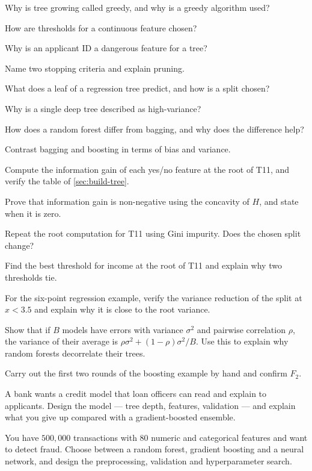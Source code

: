 \sq Why is tree growing called greedy, and why is a greedy algorithm used?

\sq How are thresholds for a continuous feature chosen?

\sq Why is an applicant ID a dangerous feature for a tree?

\sq Name two stopping criteria and explain pruning.

\sq What does a leaf of a regression tree predict, and how is a split chosen?

\sq Why is a single deep tree described as high-variance?

\sq How does a random forest differ from bagging, and why does the difference
help?

\sq Contrast bagging and boosting in terms of bias and variance.


\ap Compute the information gain of each yes/no feature at the root of T11, and
verify the table of \cref{sec:build-tree}.

\ap Prove that information gain is non-negative using the concavity of $H$, and
state when it is zero.

\ap Repeat the root computation for T11 using Gini impurity. Does the chosen
split change?

\ap Find the best threshold for income at the root of T11 and explain why two
thresholds tie.

\ap For the six-point regression example, verify the variance reduction of the
split at $x < 3.5$ and explain why it is close to the root variance.

\ap Show that if $B$ models have errors with variance $\sigma^2$ and pairwise
correlation $\rho$, the variance of their average is
$\rho\sigma^2 + (1-\rho)\sigma^2/B$. Use this to explain why random forests
decorrelate their trees.

\ap Carry out the first two rounds of the boosting example by hand and confirm
$F_2$.


\dpr A bank wants a credit model that loan officers can read and explain to
applicants. Design the model --- tree depth, features, validation --- and explain
what you give up compared with a gradient-boosted ensemble.

\dpr You have $500{,}000$ transactions with $80$ numeric and categorical features
and want to detect fraud. Choose between a random forest, gradient boosting and a
neural network, and design the preprocessing, validation and hyperparameter
search.

